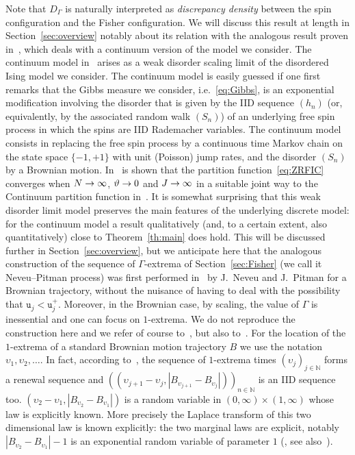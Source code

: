 \documentclass[AHL,Unicode,longabstracts,published]{cedram}
\newcommand{\bbN}{\mathbb{N}}
\newcommand{\gG}{\Gamma}
\renewcommand*\ss{\mathtt{u}}
\newcommand{\tu}{\ss}
\renewcommand*{\to}{\mathchoice{\longrightarrow}{\rightarrow}{\rightarrow}{\rightarrow}}
\begin{document}
Note that $D_\gG$ is naturally interpreted as \emph{discrepancy density} between the spin configuration and the Fisher configuration. We will discuss this result at length in Section~\ref{sec:overview} notably about its relation with the analogous result proven in~\cite{cf:CGH1}, which deals with a continuum version of the model we consider. The continuum model in~\cite{cf:CGH1} arises as a weak disorder scaling limit of the disordered Ising model we consider. {The continuum model is easily guessed if one first remarks that the Gibbs measure we consider, i.e.~\eqref{eq:Gibbs}, is an exponential modification involving the disorder that is given by the IID sequence $(h_n)$ (or, equivalently, by the associated random walk $(S_n)$) of an underlying free spin process in which the spins are IID Rademacher variables. The continuum model consists in replacing the free spin process by a continuous time Markov chain on the state space $\{-1,+1\}$ with unit (Poisson) jump rates, and the disorder $(S_n)$ by a Brownian motion.} In~\cite[Appendix~C]{cf:CGH1} is shown that the partition function~\eqref{eq:ZRFIC} converges when $N\to \infty$, $\vartheta\to 0$ and $J \to \infty$ in a suitable joint way to the Continuum partition function in~\cite{cf:CGH1}. It is somewhat surprising that this weak disorder limit model preserves the main features of the underlying discrete model: for the continuum model a result qualitatively (and, to a certain extent, also quantitatively) close to Theorem~\ref{th:main} does hold. This will be discussed further in Section~\ref{sec:overview}, but we anticipate here that the analogous construction of the sequence of $\gG$-extrema of Section~\ref{sec:Fisher} (we call it Neveu--Pitman process) was first performed in~\cite{cf:NP89} by J.~Neveu and J.~Pitman for a Brownian trajectory, without the nuisance of having to deal with the possibility that $\tu_j< \tu_j^+$. Moreover, in the Brownian case, by scaling, the value of $\gG$ is inessential and one can focus on $1$-extrema. We do not reproduce the construction here and we refer of course to~\cite{cf:NP89}, but also to~\cite{cf:BF08,cf:Cheliotis,cf:CGH1}. For the location of the $1$-extrema of a standard Brownian motion trajectory $B$ we use the notation $\upsilon_1, \upsilon_2, \dots$. In fact, according to~\cite{cf:NP89}, the sequence of $1$-extrema times $(\upsilon_j)_{j \in \bbN}$ forms a renewal sequence and $((\upsilon_{j+1}-\upsilon_j, |B_{\upsilon_{j+1}}-B_{\upsilon_{j}}|))_{n\in \bbN}$ is an IID sequence too. $(\upsilon_{2}-\upsilon_1, |B_{\upsilon_{2}}-B_{\upsilon_{1}}|)$ is a random variable in $(0, \infty)\times (1, \infty)$ whose law is explicitly known. More precisely the Laplace transform of this two dimensional law is known explicitly: the two marginal laws are explicit, notably $ | B_{\upsilon_{2}}-B_{\upsilon_{1}}|-1$ is an exponential random variable of parameter $1$ (\cite{cf:NP89}, see also~\cite{cf:FLDM01}).
\end{document}
